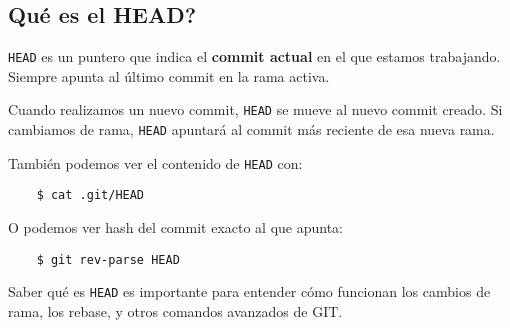     \subsection{Qu\'e es el HEAD?}
        \texttt{HEAD} es un puntero que indica el \textbf{commit actual} en el que estamos trabajando. Siempre apunta al \'ultimo commit en la rama activa.
        
        Cuando realizamos un nuevo commit, \texttt{HEAD} se mueve al nuevo commit creado. 
        Si cambiamos de rama, \texttt{HEAD} apuntar\'a al commit m\'as reciente de esa nueva rama.

        Tambi\'en podemos ver el contenido de \texttt{HEAD} con:
        \begin{lstlisting}
    $ cat .git/HEAD
        \end{lstlisting}
        O podemos ver hash del commit exacto al que apunta:
        \begin{lstlisting}
    $ git rev-parse HEAD
        \end{lstlisting}

        Saber qu\'e es \texttt{HEAD} es importante para entender c\'omo funcionan los cambios de rama, los rebase, y otros comandos avanzados de GIT.